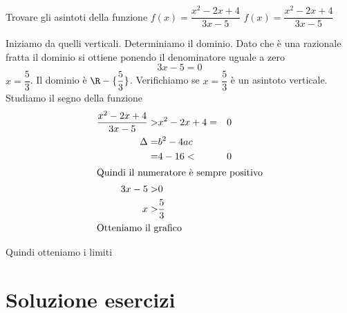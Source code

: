 \begin{exercise}
Trovare gli asintoti della funzione $f(x)=\dfrac{x^2-2x+4}{3x-5}$
	\tcblower
$f(x)=\dfrac{x^2-2x+4}{3x-5}$

Iniziamo da quelli verticali. Determiniamo il dominio. Dato che è una razionale fratta il dominio si ottiene ponendo il denominatore uguale a zero\[3x-5=0\] $x=\dfrac{5}{3}$. Il dominio è $\R-\lbrace\dfrac{5}{3}\rbrace$. Verifichiamo se $x=\dfrac{5}{3}$ è un asintoto verticale. Studiamo il segno della funzione
\begin{align*}
\dfrac{x^2-2x+4}{3x-5}>&
x^2-2x+4=&0\\
\Delta=&b^2-4ac\\
=&4-16<&0\\
\intertext{Quindi il numeratore è sempre positivo}
3x-5>&0\\
x>&\dfrac{5}{3}\\
\intertext{Otteniamo il grafico}
\end{align*}
	\begin{center}
	
\end{center}
Quindi otteniamo i limiti
\end{exercise}

\tcbstoprecording
\newpage
\section{Soluzione esercizi}
\tcbinputrecords
\newpage
